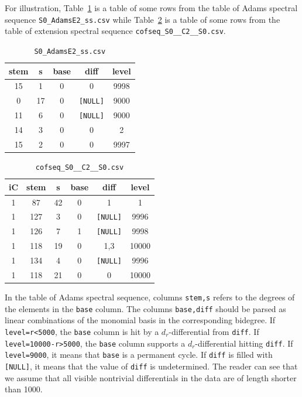 \documentclass{amsart}
\numberwithin{equation}{section}
\begin{document}
For illustration, Table~\ref{tb:ss} is a table of some rows from the table of Adams spectral sequence \texttt{S0\_AdamsE2\_ss.csv} while Table~\ref{tb:cs} is a table of some rows from the table of extension spectral sequence \texttt{cofseq\_S0\_\_C2\_\_S0.csv}.

\begin{table}
\begin{tabular}{|c|c|c|c|c|}\hline
stem & s & base & diff & level \\\hline
15 & 1 & 0 & 0 & 9998 \\\hline
0 & 17 & 0 & \verb|[NULL]| & 9000 \\\hline
11 & 6 & 0 & \verb|[NULL]| & 9000 \\\hline
14 & 3 & 0 & 0 & 2 \\\hline
15 & 2 & 0 & 0 & 9997 \\\hline
\end{tabular}
\caption{\texttt{S0\_AdamsE2\_ss.csv}}\label{tb:ss}
\end{table}

\begin{table}
\begin{tabular}{|c|c|c|c|c|c|}\hline
iC & stem & s & base & diff & level\\\hline
1 & 87 & 42 & 0 & 1 & 1\\\hline
1 & 127 & 3 & 0 & \verb|[NULL]| & 9996\\\hline
1 & 126 & 7 & 1 & \verb|[NULL]| & 9998\\\hline
1 & 118 & 19 & 0 & 1,3 & 10000\\\hline
1 & 134 & 4 & 0 & \verb|[NULL]| & 9996\\\hline
1 & 118 & 21 & 0 & 0 & 10000\\\hline
\end{tabular}
\caption{\texttt{cofseq\_S0\_\_C2\_\_S0.csv}}\label{tb:cs}
\end{table}

\begin{notation}\label{nt:4b392f50}
    In the table of Adams spectral sequence, columns \verb|stem,s| refers to the degrees of the elements in the \verb|base| column. The columns \verb|base,diff| should be parsed as linear combinations of the monomial basis in the corresponding bidegree. If \verb|level=r<5000|, the \verb|base| column is hit by a $d_r$-differential from \verb|diff|. If \verb|level=10000-r>5000|, the \verb|base| column supports a $d_r$-differential hitting \verb|diff|. If \verb|level=9000|, it means that \verb|base| is a permanent cycle. If \verb|diff| is filled with \verb|[NULL]|, it means that the value of \verb|diff| is undetermined. The reader can see that we assume that all visible nontrivial differentials in the data are of length shorter than 1000.
\end{notation}
\end{document}
